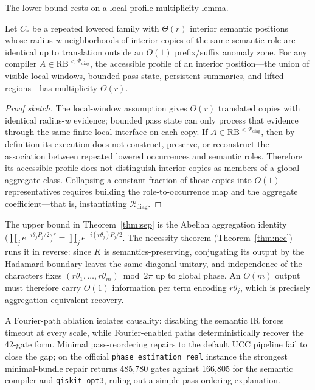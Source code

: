 \documentclass[a4paper]{article}
\begin{document}
The lower bound rests on a local-profile multiplicity lemma.

\begin{lemma}\label{lem:profile}
Let $C_r$ be a repeated lowered family with $\Theta(r)$ interior semantic positions whose radius-$w$
neighborhoods of interior copies of the same semantic role are identical up to translation outside an
$O(1)$ prefix/suffix anomaly zone. For any compiler $A\in\mathrm{RB}^{<\mathcal{R}_{\mathrm{diag}}}$,
the accessible profile of an interior position---the union of visible local windows, bounded pass
state, persistent summaries, and lifted regions---has multiplicity $\Theta(r)$.
\end{lemma}

\begin{proof}[Proof sketch]
The local-window assumption gives $\Theta(r)$ translated copies with identical radius-$w$ evidence;
bounded pass state can only process that evidence through the same finite local interface on each
copy. If $A\in\mathrm{RB}^{<\mathcal{R}_{\mathrm{diag}}}$, then by definition its execution does not
construct, preserve, or reconstruct the association between repeated lowered occurrences and semantic
roles. Therefore its accessible profile does not distinguish interior copies as members of a global
aggregate class. Collapsing a constant fraction of those copies into $O(1)$ representatives requires
building the role-to-occurrence map and the aggregate coefficient---that is, instantiating
$\mathcal{R}_{\mathrm{diag}}$.
\end{proof}

The upper bound in Theorem~\ref{thm:sep} is the Abelian aggregation identity
$\big(\prod_j e^{-i\theta_jP_j/2}\big)^r=\prod_j e^{-i(r\theta_j)P_j/2}$. The necessity theorem
(Theorem~\ref{thm:nec}) runs it in reverse: since $K$ is semantics-preserving, conjugating its output
by the Hadamard boundary leaves the same diagonal unitary, and independence of the characters fixes
$(r\theta_1,\dots,r\theta_m)\bmod 2\pi$ up to global phase. An $O(m)$ output must therefore carry
$O(1)$ information per term encoding $r\theta_j$, which is precisely aggregation-equivalent recovery.

A Fourier-path ablation isolates causality: disabling the semantic IR forces timeout at every scale,
while Fourier-enabled paths deterministically recover the 42-gate form. Minimal pass-reordering
repairs to the default UCC pipeline fail to close the gap; on the official
\texttt{phase\_estimation\_real} instance the strongest minimal-bundle repair returns 485{,}780 gates
against 166{,}805 for the semantic compiler and \texttt{qiskit opt3}, ruling out a simple
pass-ordering explanation.
\end{document}
